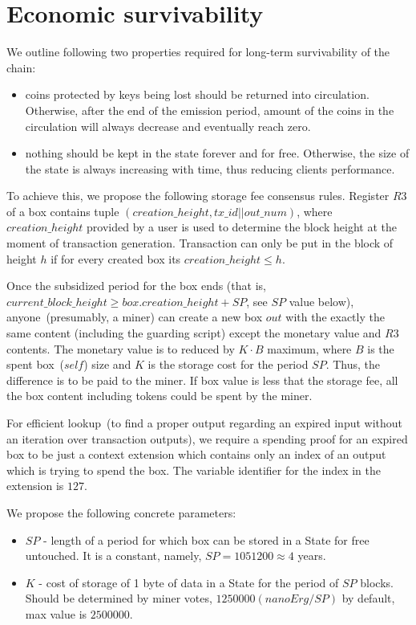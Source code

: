 \section{Economic survivability}

We outline following two properties required for long-term survivability of the chain:

\begin{itemize}
    \item{} coins protected by keys being lost should be returned into circulation.
    Otherwise, after the end of the emission period, amount of the coins
    in the circulation will always decrease and eventually reach zero.
    \item{} nothing should be kept in the state forever and for free.
    Otherwise, the size of the state is always increasing with time, thus reducing clients performance.
\end{itemize}

To achieve this, we propose the following storage fee consensus rules.
Register $R3$ of a box contains tuple $(creation\_height, tx\_id || out\_num)$, where $creation\_height$ provided by a user
is used to determine the block height at the moment of transaction generation.
Transaction can only be put in the block of height $h$ if for every created box its $creation\_height \le h$.

Once the subsidized period for the box ends (that is,
$current\_block\_height \ge box.creation\_height + SP$, see $SP$ value below), anyone~(presumably, a miner) can
create a new box $out$ with the exactly the same content (including the guarding
script) except the monetary value and $R3$ contents. The monetary value is to
reduced by $K \cdot B$ maximum, where $B$ is the spent box~($self$)
size and $K$ is the storage cost for the period $SP$. Thus, the difference is to be paid to the miner.
If box value is less that the storage fee, all the box content including tokens could be spent by the miner.

For efficient lookup~(to find a proper output regarding an expired input without an iteration over transaction outputs),
we require a spending proof for an expired box to be just a context extension which contains only an index of an
output which is trying to spend the box. The variable identifier for the index in the extension is $127$.

We propose the following concrete parameters:
\begin{itemize}
    \item{} $SP$ - length of a period for which box can be stored in a State for free untouched.
    It is a constant, namely, $SP = 1051200 \approx 4$ years.
    \item{} $K$ - cost of storage of 1 byte of data in a State for the period of $SP$ blocks.
    Should be determined by miner votes, $1250000 (nanoErg/SP)$ by default, max value is $2500000$.
\end{itemize}


